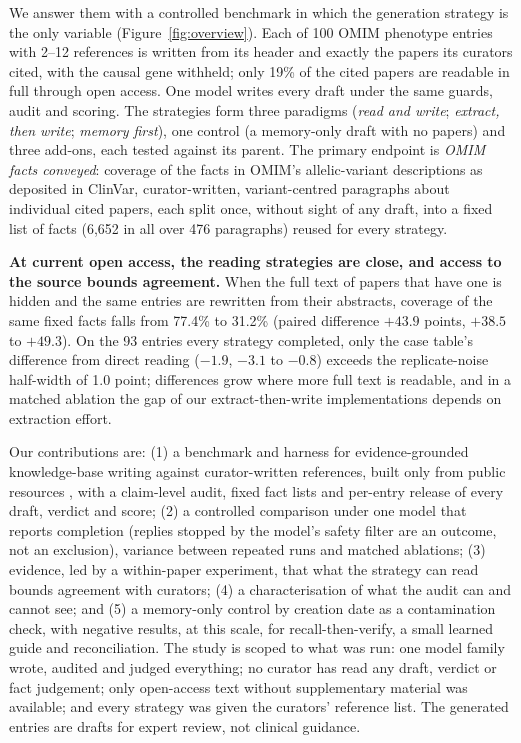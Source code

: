 \documentclass{article} %
\begin{document}
We answer them with a controlled benchmark in which the generation strategy is the only variable (Figure~\ref{fig:overview}). Each of 100 OMIM phenotype entries with 2--12 references is written from its header and exactly the papers its curators cited, with the causal gene withheld; only 19\% of the cited papers are readable in full through open access. One model writes every draft under the same guards, audit and scoring. The strategies form three paradigms (\emph{read and write}; \emph{extract, then write}; \emph{memory first}), one control (a memory-only draft with no papers) and three add-ons, each tested against its parent. The primary endpoint is \emph{OMIM facts conveyed}: coverage of the facts in OMIM's allelic-variant descriptions as deposited in ClinVar, curator-written, variant-centred paragraphs about individual cited papers, each split once, without sight of any draft, into a fixed list of facts (6,652 in all over 476 paragraphs) reused for every strategy.

\textbf{At current open access, the reading strategies are close, and access to the source bounds agreement.} When the full text of papers that have one is hidden and the same entries are rewritten from their abstracts, coverage of the same fixed facts falls from 77.4\% to 31.2\% (paired difference $+43.9$ points, $+38.5$ to $+49.3$). On the 93 entries every strategy completed, only the case table's difference from direct reading ($-1.9$, $-3.1$ to $-0.8$) exceeds the replicate-noise half-width of 1.0 point; differences grow where more full text is readable, and in a matched ablation the gap of our extract-then-write implementations depends on extraction effort.

Our contributions are: (1) a benchmark and harness for evidence-grounded knowledge-base writing against curator-written references, built only from public resources \citep{sayers2026database,Louden2020MedgenNcbis,rosonovski2024europe,seal2023genenames}, with a claim-level audit, fixed fact lists and per-entry release of every draft, verdict and score; (2) a controlled comparison under one model that reports completion (replies stopped by the model's safety filter are an outcome, not an exclusion), variance between repeated runs and matched ablations; (3) evidence, led by a within-paper experiment, that what the strategy can read bounds agreement with curators; (4) a characterisation of what the audit can and cannot see; and (5) a memory-only control by creation date as a contamination check, with negative results, at this scale, for recall-then-verify, a small learned guide and reconciliation. The study is scoped to what was run: one model family wrote, audited and judged everything; no curator has read any draft, verdict or fact judgement; only open-access text without supplementary material was available; and every strategy was given the curators' reference list. The generated entries are drafts for expert review, not clinical guidance.
\end{document}
